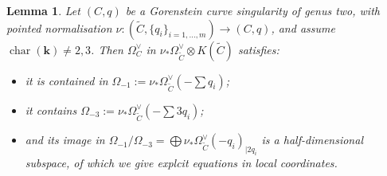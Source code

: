 \documentclass{compositio}
\renewcommand{\k}{\mathbf k}
\renewcommand{\to}{\rightarrow}
\newcommand{\bcd}{\begin{center}\begin{tikzcd}}
\newcommand{\ecd}{\end{tikzcd}\end{center}}
\theoremstyle{plain}
\newtheorem{lem}[thm]{Lemma}
\theoremstyle{definition}
\theoremstyle{remark}
\begin{document}
\begin{lem}\label{lem:aut}
Let $(C,q)$ be a Gorenstein curve singularity of genus two, with pointed normalisation $\nu\colon(\tilde C,\{q_i\}_{i=1,\ldots,m})\to (C,q)$, and assume $\operatorname{char}(\k)\neq 2,3$. Then $\Omega_C^\vee$ in $\nu_*\Omega^\vee_{\tilde C}\otimes K(\tilde C)$ satisfies:
\begin{itemize}
 \item it is contained in $\Omega_{-1}:=\nu_*\Omega^\vee_{\tilde C}(-\sum q_i)$;
 \item it contains $\Omega_{-3}:=\nu_*\Omega^\vee_{\tilde C}(-\sum3q_i)$;
 \item and its image in $\Omega_{-1}/\Omega_{-3}=\bigoplus \nu_*\Omega^\vee_{\tilde C}(-q_i)_{|2q_i}$ is a half-dimensional subspace, of which we give explcit equations in local coordinates.
\end{itemize}
\end{lem}

\end{document}
